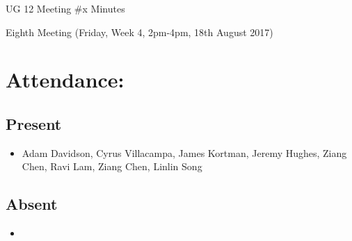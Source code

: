 \documentclass{article}
\begin{document}
\begin{adjustwidth}{2.5em}{0pt}
\begin{center}
\Large{UG 12 Meeting \#x Minutes}\\
\end{center}
\end{adjustwidth}


Eighth Meeting (Friday, Week 4, 2pm-4pm, 18th August 2017)
\section{Attendance:}
\subsection*{Present}
\begin{itemize}
\item Adam Davidson, Cyrus Villacampa, James Kortman, Jeremy Hughes, Ziang Chen, Ravi Lam, Ziang Chen, Linlin Song
\end{itemize}
\subsection*{Absent}
\begin{itemize}
\item  
\end {itemize}
\end{document}
